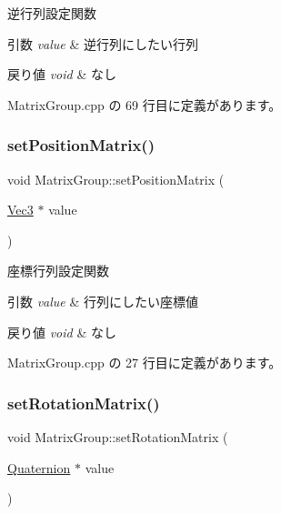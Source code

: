 逆行列設定関数 


\begin{DoxyParams}{引数}
{\em value} & 逆行列にしたい行列 \\
\hline
\end{DoxyParams}

\begin{DoxyRetVals}{戻り値}
{\em void} & なし \\
\hline
\end{DoxyRetVals}


 Matrix\+Group.\+cpp の 69 行目に定義があります。

\mbox{\label{class_matrix_group_afbf74f4d668b5d6e714d18e3acfc0a4c}} 
\subsubsection{\texorpdfstring{set\+Position\+Matrix()}{setPositionMatrix()}}
{\footnotesize\ttfamily void Matrix\+Group\+::set\+Position\+Matrix (\begin{DoxyParamCaption}\item[{\mbox{\hyperlink{_vector3_d_8h_ab16f59e4393f29a01ec8b9bbbabbe65d}{Vec3}} $\ast$}]{value }\end{DoxyParamCaption})}



座標行列設定関数 


\begin{DoxyParams}{引数}
{\em value} & 行列にしたい座標値 \\
\hline
\end{DoxyParams}

\begin{DoxyRetVals}{戻り値}
{\em void} & なし \\
\hline
\end{DoxyRetVals}


 Matrix\+Group.\+cpp の 27 行目に定義があります。

\mbox{\label{class_matrix_group_ad1703022974a4555854c8c1f0007c510}} 
\subsubsection{\texorpdfstring{set\+Rotation\+Matrix()}{setRotationMatrix()}}
{\footnotesize\ttfamily void Matrix\+Group\+::set\+Rotation\+Matrix (\begin{DoxyParamCaption}\item[{\mbox{\hyperlink{_vector3_d_8h_a3ee38c9c46d9851e33a9a1113328dafc}{Quaternion}} $\ast$}]{value }\end{DoxyParamCaption})}



